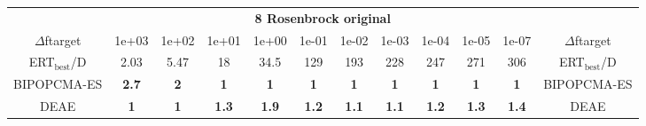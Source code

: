 \begin{tabular}{cccccccccccc}
 & \multicolumn{10}{c}{{\normalsize \textbf{8 Rosenbrock original}}}\\
$\Delta$ftarget& 1e+03& 1e+02& 1e+01& 1e+00& 1e-01& 1e-02& 1e-03& 1e-04& 1e-05& 1e-07 & $\Delta$ftarget \\
ERT$_{\textrm{best}}$/D& 2.03& 5.47& 18& 34.5& 129& 193& 228& 247& 271& 306 & ERT$_{\textrm{best}}$/D \\
\hline
BIPOPCMA-ES & \textbf{2.7} & \textbf{2} & \textbf{1} & \textbf{1} & \textbf{1} & \textbf{1} & \textbf{1} & \textbf{1} & \textbf{1} & \textbf{1} & BIPOPCMA-ES \cite{add_an_entry_for_BIPOPCMA-ES_in_bbob.bib}\\
DEAE & \textbf{1} & \textbf{1} & \textbf{1.3} & \textbf{1.9} & \textbf{1.2} & \textbf{1.1} & \textbf{1.1} & \textbf{1.2} & \textbf{1.3} & \textbf{1.4} & DEAE \cite{add_an_entry_for_DEAE_in_bbob.bib}
\end{tabular}
